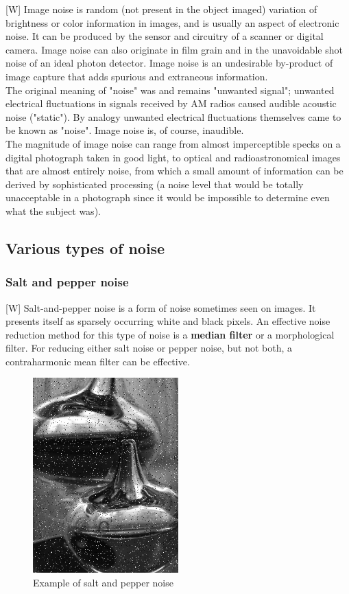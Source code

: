\documentclass[12pt]{article}
\begin{document}
	[W] Image noise is random (not present in the object imaged) variation of brightness or
	color information in images, and is usually an aspect of electronic noise. It can be
	produced by the sensor and circuitry of a scanner or digital camera. Image noise can
	also originate in film grain and in the unavoidable shot noise of an ideal photon 
	detector. Image noise is an undesirable by-product of image capture that adds spurious 
	and extraneous information.\\
	
	The original meaning of "noise" was and remains "unwanted signal"; unwanted electrical
	fluctuations in signals received by AM radios caused audible acoustic noise ("static").
	By analogy unwanted electrical fluctuations themselves came to be known as "noise". 
	Image noise is, of course, inaudible.\\

	The magnitude of image noise can range from almost imperceptible specks on a digital 
	photograph taken in good light, to optical and radioastronomical images that are almost 
	entirely noise, from which a small amount of information can be derived by sophisticated 
	processing (a noise level that would be totally unacceptable in a photograph since it 
	would be impossible to determine even what the subject was).
	
	\subsection{Various types of noise}
	
	\subsubsection{Salt and pepper noise}
	[W] Salt-and-pepper noise is a form of noise sometimes seen on images. It presents itself as 
	sparsely occurring white and black pixels. An effective noise reduction method for this 
	type of noise is a \textbf{median filter} or a morphological filter. For reducing either salt 
	noise or pepper noise, but not both, a contraharmonic mean filter can be effective.
	\begin{figure}[h!]
		\centering
		\includegraphics[width=0.5\textwidth]{img/Noise_salt_and_pepper.png}
		\caption{Example of salt and pepper noise}		
		\label{fig:salt_and_pepper}
	\end{figure}
	
\end{document}
